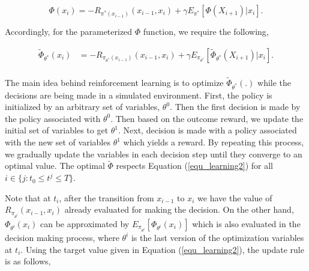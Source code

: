 \documentclass[12pt]{aastex62}
\theoremstyle{definition}
\begin{document}
\begin{equation} \label{equ_learning1}
\Phi(x_{i}) = - R_{\pi^*(x_{i-1})}(x_{i-1},x_i)  + \gamma E_{\pi^*}[\Phi(X_{{i+1}})|x_i].
\end{equation}

Accordingly, for the parameterized $\Phi$ function, we require the following,

\begin{equation} \label{equ_learning2}
\begin{aligned}
\tilde \Phi_{\theta^*}(x_{i}) &=  - R_{\pi_{\theta^*}(x_{i-1})}(x_{i-1},x_i)  + \gamma E_{\pi_{\theta^*}}[\tilde \Phi_{\theta^*}(X_{{i+1}})|x_i].\\
\end{aligned}
\end{equation}

The main idea behind reinforcement learning is to optimize $\tilde {\Phi}_{\theta^*}(.)$ while the decisions are being made in a simulated environment. First, the policy is initialized by an arbitrary set of variables, $\theta^0$. Then the first decision is made by the policy associated with $\theta^0$. Then based on the outcome reward, we update the initial set of variables to get $\theta^1$. Next, decision is made with a policy associated with the new set of variables $\theta^1$ which yields a reward. By repeating this process, we gradually update the variables in each decision step until they converge to an optimal value. The optimal $\tilde {\Phi}$ respects Equation (\ref{equ_learning2}) for all $i \in \{j: t_0 \leq t^j \leq T\}$.

Note that at $t_i$, after the transition from $x_{{i-1}}$ to $x_{{i}}$ we have the value of $R_{\pi_{\theta^i}}(x_{i-1},x_i) $ already evaluated for making the decision. On the other hand, $\Phi_{\theta^i}(x_{i})$ can be approximated by $E_{\pi_{\theta^i}}[ \Phi_{\theta^i}(x_{i})]$ which is also evaluated in the decision making process, where $\theta^i$ is the last version of the optimization variables at $t_i$. Using the target value given in Equation (\ref{equ_learning2}), the update rule is as follows,
\end{document}
